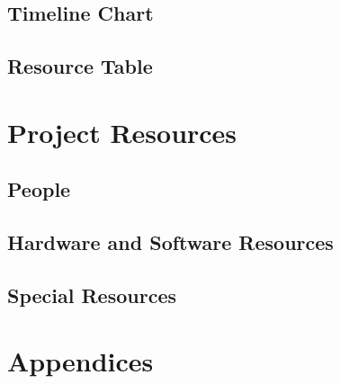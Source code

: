 \documentclass[english,12pt]{article}
\begin{document}
\subsection{Timeline Chart}

\subsection{Resource Table}

\section{Project Resources}

\subsection{People}

\subsection{Hardware and Software Resources}

\subsection{Special Resources}

\section{Appendices}
\end{document}
